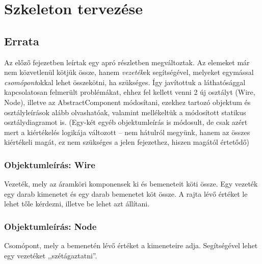 %


\newcommand{\breaktable}{%
 \setcounter{enumi_saved}{\value{enumi}}
 \end{itemize}\end{itemize}\\
 \begin{itemize}\begin{itemize}
 \setcounter{enumi}{\value{enumi_saved}}
}

\chapter{Szkeleton tervezése}

\thispagestyle{fancy}

\section{Errata}

Az előző fejezetben leírtak egy apró részletben megváltoztak. Az elemeket már nem közvetlenül kötjük össze, hanem \textit{vezeték}ek segítségével, melyeket egymással \textit{csomópont}okkal lehet összekötni, ha szükséges. Így javítottuk a láthatósággal kapcsolatosan felmerült problémákat, ehhez fel kellett venni 2 új osztályt (Wire, Node), illetve az AbstractComponent módosítani, ezekhez tartozó objektum és osztályleírások alább olvashatóak, valamint mellékeltük a módosított statikus osztálydiagramot is. (Egy-két egyéb objektumleírás is módosult, de csak azért mert a kiértékelés logikája változott -- nem hátulról megyünk, hanem az összes kiértékeli magát, ez nem szükséges a jelen fejezethez, hiszen magától értetődő)

\subsection{Objektumleírás: \bf Wire}
Vezeték, mely az áramköri komponensek ki és bemeneteit köti össze. Egy vezeték egy darab kimenetet és egy darab bemenetet köt össze. A rajta lévő értéket le lehet tőle kérdezni, illetve be lehet azt állítani.

\subsection{Objektumleírás: \bf Node}
Csomópont, mely a bemenetén lévő értéket a kimeneteire adja. Segítségével lehet egy vezetéket ,,szétágaztatni''.

